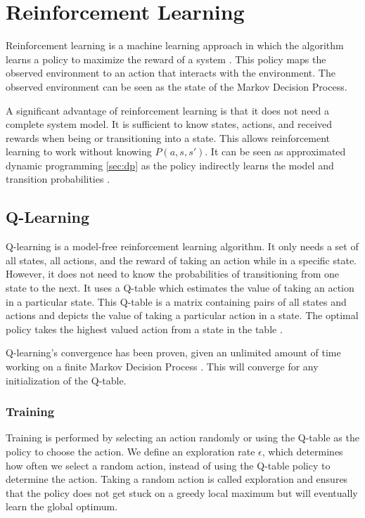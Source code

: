 \section{Reinforcement Learning}
\label{sec:rl}
Reinforcement learning is a machine learning approach in which the algorithm learns a policy to maximize the reward of a system \cite{sutton2018reinforcement}. This policy maps the observed environment to an action that interacts with the environment. The observed environment can be seen as the state of the Markov Decision Process. 

A significant advantage of reinforcement learning is that it does not need a complete system model. It is sufficient to know states, actions, and received rewards when being or transitioning into a state.
This allows reinforcement learning to work without knowing $P(a,s,s')$. It can be seen as approximated dynamic programming \ref{sec:dp} as the policy indirectly learns the model and transition probabilities \cite{bertsekas2019reinforcement}.

\subsection{Q-Learning}
\label{subsec:ql}
Q-learning is a model-free reinforcement learning algorithm. It only needs a set of all states, all actions, and the reward of taking an action while in a specific state. However, it does not need to know the probabilities of transitioning from one state to the next. It uses a Q-table which estimates the value of taking an action in a particular state. This Q-table is a matrix containing pairs of all states and actions and depicts the value of taking a particular action in a state. The optimal policy takes the highest valued action from a state in the table \cite{watkins1989learning}.

Q-learning's convergence has been proven, given an unlimited amount of time working on a finite Markov Decision Process \cite{watkins1992q}. This will converge for any initialization of the Q-table.

\subsubsection{Training}
Training is performed by selecting an action randomly or using the Q-table as the policy to choose the action. We define an exploration rate $\epsilon$, which determines how often we select a random action, instead of using the Q-table policy to determine the action. Taking a random action is called exploration and ensures that the policy does not get stuck on a greedy local maximum but will eventually learn the global optimum.

